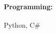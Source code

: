 \documentclass[10pt, letterpaper]{article}
\newenvironment{highlights}{
    \begin{itemize}[
        topsep=0.10 cm,
        parsep=0.10 cm,
        partopsep=0pt,
        itemsep=0pt,
        leftmargin=0 cm + 10pt
    ]
}{
    \end{itemize}
} %
\newenvironment{onecolentry}{
    \begin{adjustwidth}{
        0 cm + 0.00001 cm
    }{
        0 cm + 0.00001 cm
    }
}{
    \end{adjustwidth}
} %
\begin{document}
        \paragraph{Programming:} Python, C\#

    
        



    
    
    


    
\end{document}
